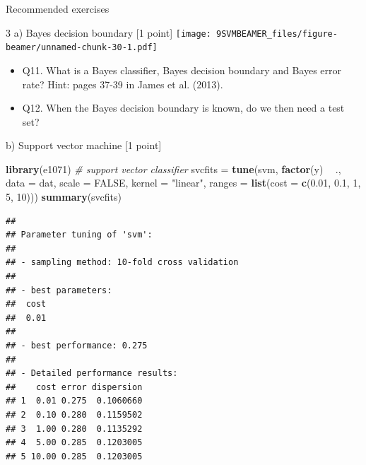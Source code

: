 \documentclass[ignorenonframetext,]{beamer}
\newenvironment{Shaded}{\begin{snugshade}}{\end{snugshade}}
\newcommand{\KeywordTok}[1]{\textcolor[rgb]{0.13,0.29,0.53}{\textbf{#1}}}
\newcommand{\DataTypeTok}[1]{\textcolor[rgb]{0.13,0.29,0.53}{#1}}
\newcommand{\DecValTok}[1]{\textcolor[rgb]{0.00,0.00,0.81}{#1}}
\newcommand{\FloatTok}[1]{\textcolor[rgb]{0.00,0.00,0.81}{#1}}
\newcommand{\StringTok}[1]{\textcolor[rgb]{0.31,0.60,0.02}{#1}}
\newcommand{\CommentTok}[1]{\textcolor[rgb]{0.56,0.35,0.01}{\textit{#1}}}
\newcommand{\OtherTok}[1]{\textcolor[rgb]{0.56,0.35,0.01}{#1}}
\newcommand{\OperatorTok}[1]{\textcolor[rgb]{0.81,0.36,0.00}{\textbf{#1}}}
\newcommand{\NormalTok}[1]{#1}
\providecommand{\tightlist}{%
  \setlength{\itemsep}{0pt}\setlength{\parskip}{0pt}}
\begin{document}
\begin{frame}[fragile]{Recommended exercises}
\begin{block}{3 a) Bayes decision boundary {[}1 point{]}}
\texttt{[image: 9SVMBEAMER\_files/figure-beamer/unnamed-chunk-30-1.pdf]}

\begin{itemize}
\tightlist
\item
  Q11. What is a Bayes classifier, Bayes decision boundary and Bayes
  error rate? Hint: pages 37-39 in James et al. (2013).
\item
  Q12. When the Bayes decision boundary is known, do we then need a test
  set?
\end{itemize}

\begin{block}{b) Support vector machine {[}1 point{]}}

\begin{Shaded}
\begin{Highlighting}[]
\KeywordTok{library}\NormalTok{(e1071)}
\CommentTok{# support vector classifier}
\NormalTok{svcfits =}\StringTok{ }\KeywordTok{tune}\NormalTok{(svm, }\KeywordTok{factor}\NormalTok{(y) }\OperatorTok{~}\StringTok{ }\NormalTok{., }\DataTypeTok{data =}\NormalTok{ dat, }\DataTypeTok{scale =} \OtherTok{FALSE}\NormalTok{, }\DataTypeTok{kernel =} \StringTok{"linear"}\NormalTok{, }
    \DataTypeTok{ranges =} \KeywordTok{list}\NormalTok{(}\DataTypeTok{cost =} \KeywordTok{c}\NormalTok{(}\FloatTok{0.01}\NormalTok{, }\FloatTok{0.1}\NormalTok{, }\DecValTok{1}\NormalTok{, }\DecValTok{5}\NormalTok{, }\DecValTok{10}\NormalTok{)))}
\KeywordTok{summary}\NormalTok{(svcfits)}
\end{Highlighting}
\end{Shaded}

\begin{verbatim}
## 
## Parameter tuning of 'svm':
## 
## - sampling method: 10-fold cross validation 
## 
## - best parameters:
##  cost
##  0.01
## 
## - best performance: 0.275 
## 
## - Detailed performance results:
##    cost error dispersion
## 1  0.01 0.275  0.1060660
## 2  0.10 0.280  0.1159502
## 3  1.00 0.280  0.1135292
## 4  5.00 0.285  0.1203005
## 5 10.00 0.285  0.1203005
\end{verbatim}


\end{block}
\end{block}
\end{frame}
\end{document}
